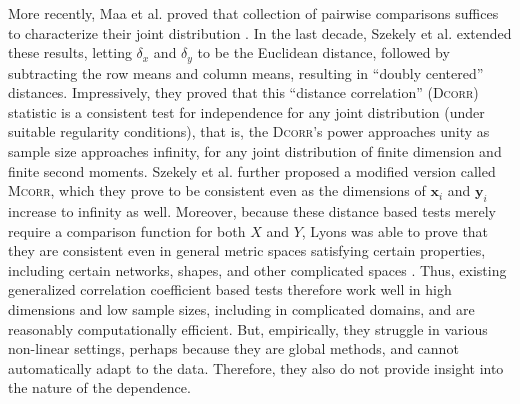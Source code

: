 \documentclass[11pt]{article}
\providecommand{\sct}[1]{{\normalfont\textsc{#1}}}
\providecommand{\mb}[1]{\boldsymbol{#1}}
\newcommand{\Dcorr}{\sct{Dcorr}}
\newcommand{\Mcorr}{\sct{Mcorr}}
\newcommand{\Mantel}{\sct{Mantel}}
\begin{document}
More recently, Maa et al. proved that collection of pairwise comparisons suffices to characterize their joint distribution \cite{Maa1996}.
In the last decade, Szekely et al. \cite{SzekelyRizzoBakirov2007} extended these results, letting $\delta_x$ and $\delta_y$ to be the Euclidean distance, followed by subtracting the row means and column means, resulting in ``doubly centered'' distances.  Impressively, they proved that this ``distance correlation'' (\Dcorr) statistic is a consistent test for independence for any joint distribution (under suitable regularity conditions), that is, the \Dcorr's power approaches unity as sample size approaches infinity, for any joint distribution of finite dimension and finite second moments.
Szekely et al. \cite{SzekelyRizzo2013a} further proposed a modified version called \Mcorr, which they prove to be consistent even as the dimensions of $\mb{x}_i$ and $\mb{y}_i$ increase to infinity as well.
Moreover, because these distance based tests merely require a comparison function for both $X$ and $Y$, Lyons was able to prove that they are consistent even in general metric spaces satisfying certain properties, including certain networks, shapes, and other complicated spaces  \cite{Lyons2013}.
% 
Thus, existing generalized correlation coefficient based tests therefore work well in high dimensions and low sample sizes, including in complicated domains, and are reasonably computationally efficient. But, empirically, they struggle in various non-linear settings, perhaps because they are global methods, and cannot  automatically adapt to the data.  Therefore, they also do not provide insight into the nature of the dependence.
\end{document}
